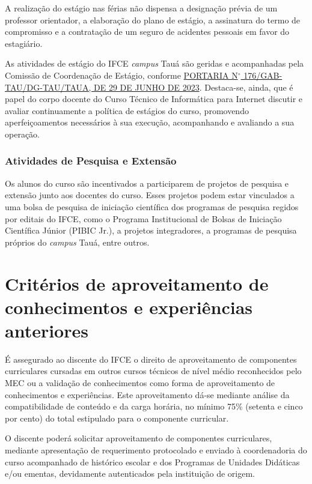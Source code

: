 \documentclass[
	12pt,				%
	openright,			%
	twoside,			%
	a4paper,			%
	chapter=TITLE,		%
	english,			%
	french,				%
	spanish,			%
	brazil,				%
	]{abntex2}
\newcommand{\nord}[1]{N$^\circ$ #1}
\begin{document}
A realização do estágio nas férias não dispensa a designação prévia de um
professor orientador, a elaboração do plano de estágio, a assinatura do termo de compromisso e a contratação de um seguro de acidentes pessoais em favor do estagiário.

As atividades de estágio do IFCE \textit{campus} Tauá são geridas e acompanhadas pela Comissão de Coordenação de Estágio, conforme  \href{https://sei.ifce.edu.br/sei/controlador_externo.php?acao=documento_conferir&codigo_verificador=5049721&codigo_crc=D2A855C5&hash_download=8211d5eecb230cb8765ceb54199b56b9dcf61d684050d5c575df55732d493c4e40f77568847d43c092af63a30df085c55666384493a581b4cc78038b5247d885&visualizacao=1&id_orgao_acesso_externo=0}{PORTARIA \nord{176}/GAB-TAU/DG-TAU/TAUA, DE 29 DE JUNHO DE 2023}. Destaca-se, ainda, que é papel do corpo docente do Curso Técnico de Informática para Internet discutir e avaliar continuamente a política de estágios do curso, promovendo aperfeiçoamentos necessários à sua execução, acompanhando e avaliando a sua operação.


\subsection{Atividades de Pesquisa e Extensão}
Os alunos do curso são incentivados a participarem de projetos de pesquisa e extensão junto aos docentes do curso. Esses projetos podem estar vinculados a uma bolsa de pesquisa de iniciação científica dos programas de pesquisa regidos por editais do IFCE, como o  Programa Institucional de Bolsas de Iniciação Científica Júnior (PIBIC Jr.), a projetos integradores, a programas de pesquisa próprios do \textit{campus} Tauá, entre outros. 


\chapter{Critérios de aproveitamento de conhecimentos e experiências anteriores}


É assegurado ao discente do IFCE o direito de aproveitamento de componentes curriculares cursadas em outros cursos técnicos de nível médio reconhecidos pelo MEC ou a validação de conhecimentos como forma de aproveitamento de conhecimentos e experiências. Este aproveitamento dá-se mediante análise da compatibilidade de conteúdo e da carga horária, no mínimo 75\% (setenta e cinco por cento) do total estipulado para o componente curricular.

O discente poderá solicitar aproveitamento de componentes curriculares, mediante apresentação de requerimento protocolado e enviado à coordenadoria do curso acompanhado de histórico escolar e dos Programas de Unidades Didáticas e/ou ementas, devidamente autenticados pela instituição de origem.
\end{document}
